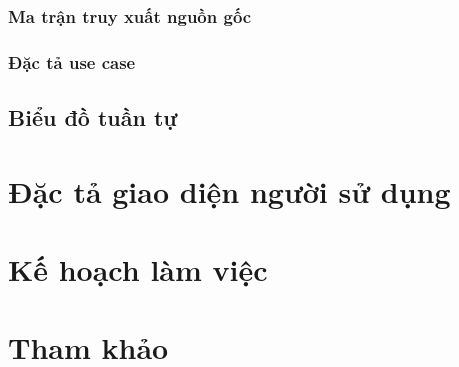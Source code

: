 \documentclass[a4paper, 12pt]{article}
\begin{document}
    \subsubsection{Ma trận truy xuất nguồn gốc}
    \subsubsection{Đặc tả use case}

    \subsection{Biểu đồ tuần tự}
    \clearpage

    \section{Đặc tả giao diện người sử dụng}
    \label{sec:describeUI}
    \clearpage

    \section{Kế hoạch làm việc}
    \label{sec:plan}
    \clearpage

    \section{Tham khảo}
    \label{sec:reference}
    \clearpage
\end{document}

